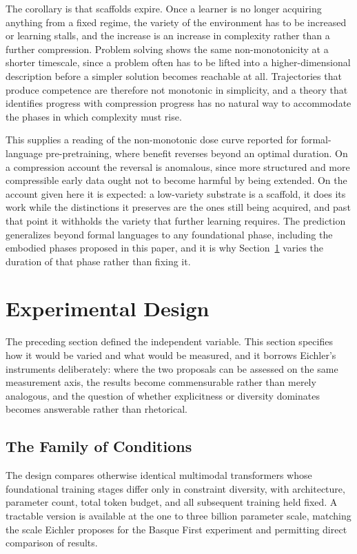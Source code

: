 \documentclass[11pt]{article}
\begin{document}
The corollary is that scaffolds expire. Once a learner is no longer acquiring anything from a fixed regime, the variety of the environment has to be increased or learning stalls, and the increase is an increase in complexity rather than a further compression. Problem solving shows the same non-monotonicity at a shorter timescale, since a problem often has to be lifted into a higher-dimensional description before a simpler solution becomes reachable at all. Trajectories that produce competence are therefore not monotonic in simplicity, and a theory that identifies progress with compression progress has no natural way to accommodate the phases in which complexity must rise.

This supplies a reading of the non-monotonic dose curve reported for formal-language pre-pretraining, where benefit reverses beyond an optimal duration. On a compression account the reversal is anomalous, since more structured and more compressible early data ought not to become harmful by being extended. On the account given here it is expected: a low-variety substrate is a scaffold, it does its work while the distinctions it preserves are the ones still being acquired, and past that point it withholds the variety that further learning requires. The prediction generalizes beyond formal languages to any foundational phase, including the embodied phases proposed in this paper, and it is why Section~\ref{sec:experiment} varies the duration of that phase rather than fixing it.


\section{Experimental Design}
\label{sec:experiment}

The preceding section defined the independent variable. This section specifies how it would be varied and what would be measured, and it borrows Eichler's instruments deliberately: where the two proposals can be assessed on the same measurement axis, the results become commensurable rather than merely analogous, and the question of whether explicitness or diversity dominates becomes answerable rather than rhetorical.

\subsection{The Family of Conditions}

The design compares otherwise identical multimodal transformers whose foundational training stages differ only in constraint diversity, with architecture, parameter count, total token budget, and all subsequent training held fixed. A tractable version is available at the one to three billion parameter scale, matching the scale Eichler proposes for the Basque First experiment and permitting direct comparison of results.
\end{document}
